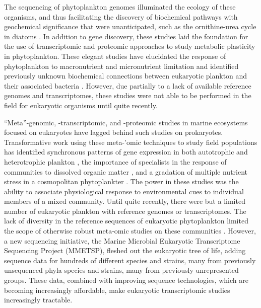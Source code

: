 The sequencing of phytoplankton genomes \citep{Armbrust2004,Derelle2006,Read2013,Worden2009,Gobler2011a,Bowler2008} illuminated the ecology of these organisms, and thus facilitating the discovery of biochemical pathways with geochemical significance that were unanticipated, such as the ornithine-urea cycle in diatoms \citep{Armbrust2004}. In addition to gene discovery, these studies laid the foundation for the use of transcriptomic \citep{Mock2008, Dyhrman2012,Mock2008} and proteomic \citep{Wurch2011,Bertrand2012a,Jones2013} approaches to study metabolic plasticity in phytoplankton. These elegant studies have elucidated the response of phytoplankton to macronutrient  \citep{Rokitta2014, Dyhrman2012,Wurch2011,Shrestha2012,Mock2008,Bender2014,Allen2011} and micronutrient limitation \citep{Lommer2012,Nunn2013,Allen2008,Marchetti2009a, Bertrand2012a} and identified previously unknown biochemical connections between eukaryotic plankton and their associated bacteria \citep{Durham2015}. However, due partially to a lack of available reference genomes and transcriptomes, these studies were not able to be performed in the field for eukaryotic organisms until quite recently.  \par
        
``Meta''-genomic, -transcriptomic, and -proteomic studies in marine ecosystems focused on eukaryotes have lagged behind such studies on prokaryotes. Transformative work using these meta-'omic techniques to study field populations has identified synchronous patterns of gene expression in both autotrophic and heterotrophic plankton \citep{Ottesen2014,Ottesen2013}, the importance of specialists in the response of communities to dissolved organic matter \citep{McCarren2010}, and a gradation of multiple nutrient stress in a cosmopolitan phytoplankter \citep{Saito2014}. The power in these studies was the ability to associate physiological response to environmental cues to individual members of a mixed community. Until quite recently, there were but a limited  number of eukaryotic plankton with reference genomes or transcriptomes. The lack of diversity in the reference sequences of eukaryotic phytoplankton limited the scope of otherwise robust meta-omic studies on these communities \citep{Marchetti2012a}. However, a new sequencing initiative, the Marine Microbial Eukaryotic Transcriptome Sequencing Project (MMETSP), fleshed out the eukaryotic tree of life, adding sequence data for hundreds of different species and strains, many from previously unsequenced phyla \citep{Keeling2014} species and strains, many from previously unrepresented groups. These data, combined with improving sequence technologies, which are becoming increasingly affordable, make eukaryotic transcriptomic studies increasingly tractable. 

